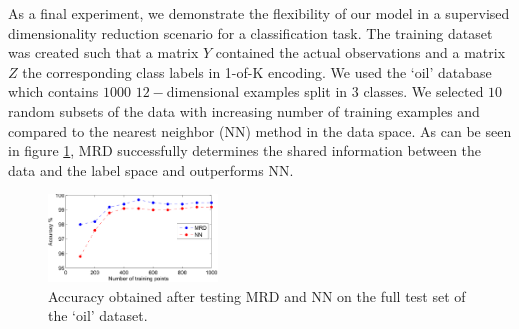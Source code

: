 As a final experiment, we demonstrate the flexibility of our model in
a supervised dimensionality reduction scenario for a classification
task. The training dataset was created such that a matrix $Y$
contained the actual observations and a matrix $Z$ the corresponding
class labels in 1-of-K encoding.  We used the `oil' database
\cite{Bishop:oil93} which contains $1000$ $12-$dimensional examples
split in $3$ classes.  We selected $10$ random subsets of the data
with increasing number of training examples and compared to the
nearest neighbor (NN) method in the data space. As can be seen in
figure \ref{fig:oilErrors}, MRD successfully determines the shared
information between the data and the label space and outperforms NN.
\begin{figure}[ht]
\begin{center}
  \includegraphics[width=0.4\textwidth]{../diagrams/errorAccuracy}
\end{center}
\vspace{-0.1cm}
\caption{
Accuracy obtained after testing MRD and NN on the full test set of the `oil' dataset.
}
\label{fig:oilErrors}
\end{figure}


